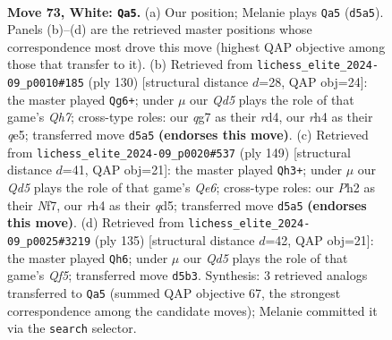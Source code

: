 \documentclass[11pt]{article}
\begin{document}
\clearpage

\begin{figure}[p]\centering
\begin{subfigure}{0.46\textwidth}\centering
\resizebox{\linewidth}{!}{%
\newchessgame
\chessboard[
  setfen={8/6qk/5p2/3Q4/7r/6P1/6KP/8 w - - 1 73},
  showmover=false,
  pgfstyle=straightmove, color=movearrow, markmove={d5-a5}
]}
\caption{}
\end{subfigure}\hfill
\begin{subfigure}{0.46\textwidth}\centering
\resizebox{\linewidth}{!}{%
\newchessgame
\chessboard[
  setfen={1r6/7Q/3k4/1p2q3/3r2PK/7P/8/8 w - - 8 66},
  showmover=false,
  pgfstyle=straightmove, color=movearrow, markmove={h7-g6}
]}
\caption{}
\end{subfigure}
\\[4pt]
\begin{subfigure}{0.46\textwidth}\centering
\resizebox{\linewidth}{!}{%
\newchessgame
\chessboard[
  setfen={8/3K1nk1/5p2/3Q4/2P5/4q3/5p2/Q7 b - - 3 75},
  showmover=false,
  pgfstyle=straightmove, color=movearrow, markmove={e3-h3}
]}
\caption{}
\end{subfigure}\hfill
\begin{subfigure}{0.46\textwidth}\centering
\resizebox{\linewidth}{!}{%
\newchessgame
\chessboard[
  setfen={6K1/8/4Q1P1/8/5q2/1p6/k7/8 b - - 1 68},
  showmover=false,
  pgfstyle=straightmove, color=movearrow, markmove={f4-h6}
]}
\caption{}
\end{subfigure}
\caption{\textbf{Move 73, White: \texttt{Qa5}.} (a) Our position; Melanie plays \texttt{Qa5} (\texttt{d5a5}). Panels (b)--(d) are the retrieved master positions whose correspondence most drove this move (highest QAP objective among those that transfer to it). (b) Retrieved from \texttt{lichess\_elite\_2024-09\_p0010\#185} (ply 130) [structural distance $d$=28, QAP obj=24]: the master played \texttt{Qg6+}; under $\mu$ our \emph{Qd5} plays the role of that game's \emph{Qh7}; cross-type roles: our \emph{q}g7 as their \emph{r}d4, our \emph{r}h4 as their \emph{q}e5; transferred move \texttt{d5a5} \textbf{(endorses this move)}. (c) Retrieved from \texttt{lichess\_elite\_2024-09\_p0020\#537} (ply 149) [structural distance $d$=41, QAP obj=21]: the master played \texttt{Qh3+}; under $\mu$ our \emph{Qd5} plays the role of that game's \emph{Qe6}; cross-type roles: our \emph{P}h2 as their \emph{N}f7, our \emph{r}h4 as their \emph{q}d5; transferred move \texttt{d5a5} \textbf{(endorses this move)}. (d) Retrieved from \texttt{lichess\_elite\_2024-09\_p0025\#3219} (ply 135) [structural distance $d$=42, QAP obj=21]: the master played \texttt{Qh6}; under $\mu$ our \emph{Qd5} plays the role of that game's \emph{Qf5}; transferred move \texttt{d5b3}. Synthesis: 3 retrieved analogs transferred to \texttt{Qa5} (summed QAP objective 67, the strongest correspondence among the candidate moves); Melanie committed it via the \texttt{search} selector.}
\label{fig:thought-m144}
\end{figure}
\end{document}
